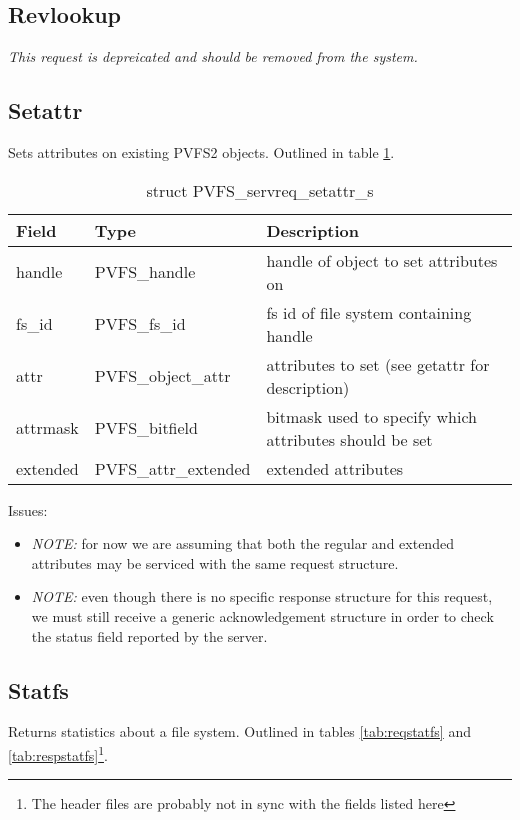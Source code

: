 \documentclass[11pt, letterpaper]{article} %
\begin{document}
\subsection{Revlookup}

\emph{This request is depreicated and should be removed from the
system.}

\subsection{Setattr}

Sets attributes on existing PVFS2 objects.  Outlined in table
\ref{tab:reqsetattr}.

\begin{table}[H]
\begin{tabular}{|l|l|l|}
\hline
Field & Type & Description \\
\hline
\hline
handle & PVFS\_handle & handle of object to set attributes on\\
\hline
fs\_id & PVFS\_fs\_id & fs id of file system containing handle\\
\hline 
attr & PVFS\_object\_attr & attributes to set (see getattr for
description)\\
\hline
attrmask & PVFS\_bitfield & bitmask used to specify which attributes
should be set\\
\hline
extended & PVFS\_attr\_extended & extended attributes\\
\hline
\end{tabular}
\caption{struct PVFS\_servreq\_setattr\_s \label{tab:reqsetattr}}
\end{table}

Issues:
\begin{itemize}
\item \emph{NOTE:} for now we are assuming that both the regular and
extended attributes may be serviced with the same request structure.
\item \emph{NOTE:} even though there is no specific response structure
for this request, we must still receive a generic acknowledgement
structure in order to check the status field reported by the server.
\end{itemize}

\subsection{Statfs}

Returns statistics about a file system.  Outlined in tables
\ref{tab:reqstatfs} and \ref{tab:respstatfs}\footnote{The header files are
probably not in sync with the fields listed here}.
\end{document}
